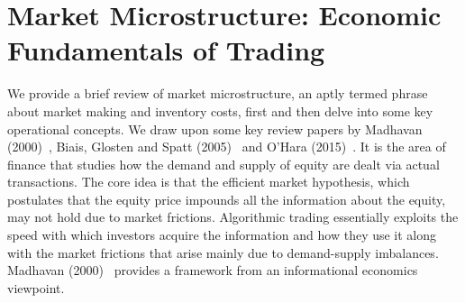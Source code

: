 \section{Market Microstructure: Economic Fundamentals of Trading}

We provide a brief review of market microstructure, an aptly termed phrase about market making and inventory costs, first and then delve into some key operational concepts. We draw upon some key review papers by Madhavan (2000)~\cite{madhavan2000}, Biais, Glosten and Spatt (2005)~\cite{bgs05} and O'Hara (2015)~\cite{ohara15hfmm}. It is the area of finance that studies how the demand and supply of equity are dealt via actual transactions. The core idea is that the efficient market hypothesis, which postulates that the equity price impounds all the information about the equity, may not hold due to market frictions. Algorithmic trading essentially exploits the speed with which investors acquire the information and how they use it along with the market frictions that arise mainly due to demand-supply imbalances. Madhavan (2000)~\cite{madhavan2000} provides a framework from an informational economics viewpoint. 


